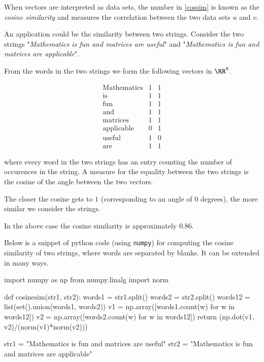 \documentclass{article}
\begin{document}
\begin{example}

  When vectors are interpreted as data sets,
  the number in \eqref{cossim} is known as the \emph{cosine similarity}
and measures the correlation between the two data sets
$u$ and $v$.

An application could be the similarity between two strings.
Consider the two strings 
"\emph{Mathematics is fun and matrices are useful}"
and
"\emph{Mathematics is fun and matrices are applicable}".

From the words in the two strings we form the following vectors in $\RR^8$.

$$
\begin{array}{lll}
  \text{Mathematics} & 1 & 1\\[0.5em]
  \text{is} & 1& 1\\[0.5em]
  \text{fun} & 1 & 1\\[0.5em]
  \text{and} & 1 & 1\\[0.5em]
  \text{matrices} & 1 & 1\\[0.5em]
  \text{applicable} & 0 & 1\\[0.5em]
  \text{useful} & 1 & 0\\[0.5em]
  \text{are} & 1 & 1
\end{array}
$$

where every word in the two strings has an entry counting the number of
occurences in the string. A measure for the equality between
the two strings is the cosine of the angle between the two vectors.

The closer the cosine gets to $1$ (corresponding to an angle of $0$
degrees), the more similar we consider the strings.

In the above case the cosine similarity is approximately $0.86$.

Below is a snippet of python code (using \texttt{numpy}) for computing the cosine similarity of two strings, where
words are separated by blanks. It can be extended in many ways.


\begin{sage}
import numpy as np
from numpy.linalg import norm

def cosinesim(str1, str2):
  words1 = str1.split()
  words2 = str2.split()
  words12 = list(set().union(words1, words2))
  v1 = np.array([words1.count(w) for w in words12])
  v2 = np.array([words2.count(w) for w in words12])
  return (np.dot(v1, v2)/(norm(v1)*norm(v2)))

str1 = "Mathematics is fun and matrices are useful"
str2 = "Mathematics is fun and matrices are applicable"


\end{sage}
\end{example}
\end{document}
